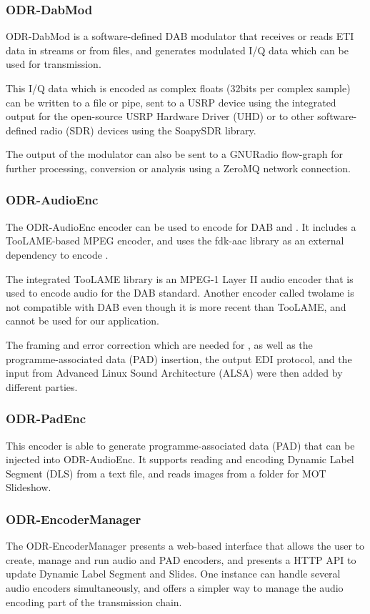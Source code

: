 \subsubsection{ODR-DabMod}
ODR-DabMod is a software-defined DAB modulator that receives or reads ETI data
in streams or from files, and generates modulated I/Q data which can be used for
transmission.

This I/Q data which is encoded as complex floats (32bits per complex sample) can
be written to a file or pipe, sent to a USRP device using the integrated
output for the open-source USRP Hardware Driver (UHD) or to other
software-defined radio (SDR) devices using the
SoapySDR library.

The output of the modulator can also be sent to a GNURadio flow-graph for
further processing, conversion or analysis using a ZeroMQ network connection.

\subsubsection{ODR-AudioEnc}
The ODR-AudioEnc encoder can be used to encode for DAB and \dabplus. It includes
a TooLAME-based MPEG encoder, and uses the \mbox{fdk-aac} library as an external
dependency to encode \dabplus{}.

The integrated TooLAME library is an MPEG-1 Layer II audio encoder that is used
to encode audio for the DAB standard.
Another encoder called twolame is not compatible with DAB even though it is more
recent than TooLAME, and cannot be used for our application.

The framing and error correction which are needed for \dabplus{}, as well as the
programme-associated data (PAD) insertion, the output EDI protocol,
and the input from Advanced Linux Sound Architecture (ALSA) were then added by
different parties.

\subsubsection{ODR-PadEnc}
This encoder is able to generate programme-associated data (PAD) that can be
injected into ODR-AudioEnc. It supports reading and encoding Dynamic Label
Segment (DLS) from a text file, and reads images from a folder for MOT Slideshow.

\subsubsection{ODR-EncoderManager}
The ODR-EncoderManager presents a web-based interface that allows the user to
create, manage and run audio and PAD encoders, and presents a HTTP API to update
Dynamic Label Segment and Slides. One instance can handle several audio encoders
simultaneously, and offers a simpler way to manage the audio encoding part of
the \dabplus transmission chain.

